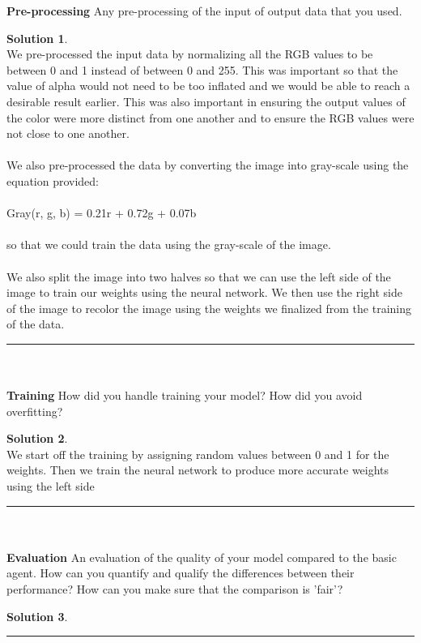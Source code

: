 \documentclass{article}
\theoremstyle{definition}
\def\fline{\rule{0.75\linewidth}{0.5pt}}
\newcommand{\finishline}{\vspace{-15pt}\begin{center}\fline\end{center}}
\newtheorem*{solution*}{Solution}
\newenvironment{solution}{\begin{solution*}}{{\finishline} \end{solution*}}
\begin{document}
    \textbf{Pre-processing}
        Any pre-processing of the input of output data that you used.
        \begin{solution} \hfill \\
        
        We pre-processed the input data by normalizing all the RGB values to be between 0 and 1 instead of between 0 and 255. This was important so that the value of alpha would not need to be too inflated and we would be able to reach a desirable result earlier. This was also important in ensuring the output values of the color were more distinct from one another and to ensure the RGB values were not close to one another.\\\\
        We also pre-processed the data by converting the image into gray-scale using the equation provided: \\\\
        Gray(r, g, b) = 0.21r + 0.72g + 0.07b \\\\
        so that we could train the data using the gray-scale of the image. \\\\
        We also split the image into two halves so that we can use the left side of the image to train our weights using the neural network. We then use the right side of the image to recolor the image using the weights we finalized from the training of the data. 
        \end{solution}\\\\
        
    \textbf{Training}
        How did you handle training your model? How did you avoid overfitting? 
        \begin{solution} \hfill \\
        We start off the training by assigning random values between 0 and 1 for the weights. Then we train the neural network to produce more accurate weights using the left side
        \end{solution}\\\\
        
    \textbf{Evaluation}
        An evaluation of the quality of your model compared to the basic agent. How can you quantify and qualify the differences between their performance? How can you make sure that the comparison is 'fair'? 
        \begin{solution} \hfill \\
    
        \end{solution}\\\\
        
\end{document}
